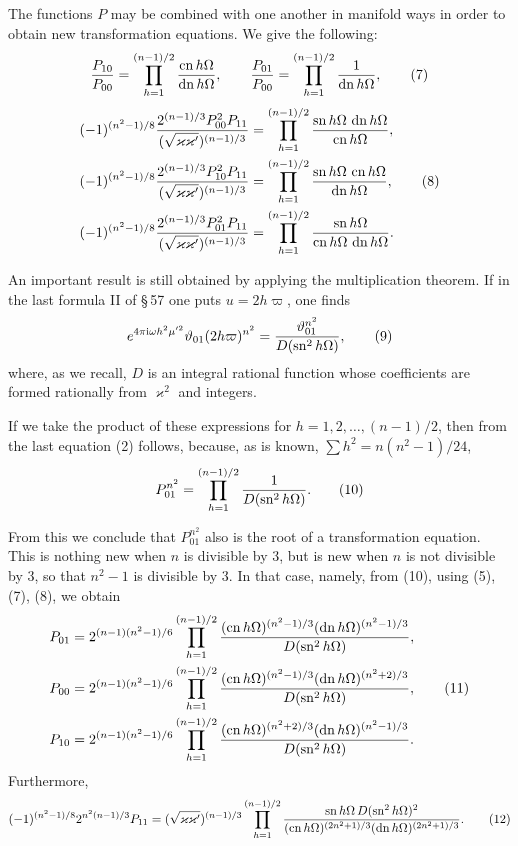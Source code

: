 \documentclass[11pt]{article}
\providecommand{\ii}{\mathrm{i}}
\providecommand{\sn}{\operatorname{sn}}
\providecommand{\cn}{\operatorname{cn}}
\providecommand{\dn}{\operatorname{dn}}
\begin{document}
The functions $P$ may be combined with one another in manifold ways in order to obtain new transformation equations. We give the following:
\begin{equation}
{P_{10}\over P_{00}}=
\prod_{h=1}^{(n-1)/2}{\cn h\Omega\over \dn h\Omega},
\qquad
{P_{01}\over P_{00}}=
\prod_{h=1}^{(n-1)/2}{1\over \dn h\Omega},
\tag{7}
\end{equation}
\begin{align}
(-1)^{(n^2-1)/8}{2^{(n-1)/3}P_{00}^{2}P_{11}\over (\sqrt{\varkappa\varkappa'})^{(n-1)/3}}
&=\prod_{h=1}^{(n-1)/2}{\sn h\Omega\,\dn h\Omega\over\cn h\Omega},\notag\\
(-1)^{(n^2-1)/8}{2^{(n-1)/3}P_{10}^{2}P_{11}\over (\sqrt{\varkappa\varkappa'})^{(n-1)/3}}
&=\prod_{h=1}^{(n-1)/2}{\sn h\Omega\,\cn h\Omega\over\dn h\Omega},\tag{8}\\
(-1)^{(n^2-1)/8}{2^{(n-1)/3}P_{01}^{2}P_{11}\over (\sqrt{\varkappa\varkappa'})^{(n-1)/3}}
&=\prod_{h=1}^{(n-1)/2}{\sn h\Omega\over\cn h\Omega\,\dn h\Omega}.
\notag
\end{align}

An important result is still obtained by applying the multiplication theorem. If in the last formula II of \S\,57 one puts $u=2h\varpi$, one finds
\begin{equation}
e^{4\pi\ii\omega h^2\mu'^2}\vartheta_{01}(2h\varpi)^{n^2}={\vartheta_{01}^{n^2}\over D(\sn^2 h\Omega)},
\tag{9}
\end{equation}
where, as we recall, $D$ is an integral rational function whose coefficients are formed rationally from $\varkappa^2$ and integers.

If we take the product of these expressions for $h=1,2,\ldots,(n-1)/2$, then from the last equation (2) follows, because, as is known, $\sum h^2=n(n^2-1)/24$,
\begin{equation}
P_{01}^{n^2}=\prod_{h=1}^{(n-1)/2}{1\over D(\sn^2 h\Omega)}.
\tag{10}
\end{equation}

From this we conclude that $P_{01}^{n^2}$ also is the root of a transformation equation. This is nothing new when $n$ is divisible by $3$, but is new when $n$ is not divisible by $3$, so that $n^2-1$ is divisible by $3$. In that case, namely, from (10), using (5), (7), (8), we obtain
\begin{align}
P_{01}&=2^{(n-1)(n^2-1)/6}
\prod_{h=1}^{(n-1)/2}{(\cn h\Omega)^{(n^2-1)/3}(\dn h\Omega)^{(n^2-1)/3}\over D(\sn^2h\Omega)},\notag\\
P_{00}&=2^{(n-1)(n^2-1)/6}
\prod_{h=1}^{(n-1)/2}{(\cn h\Omega)^{(n^2-1)/3}(\dn h\Omega)^{(n^2+2)/3}\over D(\sn^2h\Omega)},\tag{11}\\
P_{10}&=2^{(n-1)(n^2-1)/6}
\prod_{h=1}^{(n-1)/2}{(\cn h\Omega)^{(n^2+2)/3}(\dn h\Omega)^{(n^2-1)/3}\over D(\sn^2h\Omega)}.\notag
\end{align}
Furthermore,
\begin{equation}
(-1)^{(n^2-1)/8}2^{n^2(n-1)/3}P_{11}
=(\sqrt{\varkappa\varkappa'})^{(n-1)/3}
\prod_{h=1}^{(n-1)/2}{\sn h\Omega\,D(\sn^2h\Omega)^2\over
(\cn h\Omega)^{(2n^2+1)/3}(\dn h\Omega)^{(2n^2+1)/3}}.
\tag{12}
\end{equation}
\end{document}
